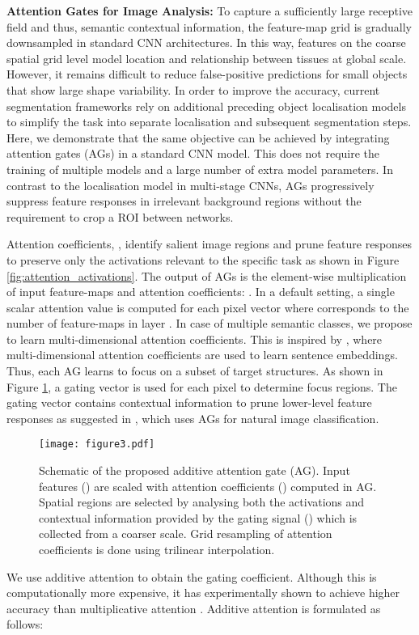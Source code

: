 \documentclass{article}
\begin{document}
\textbf{Attention Gates for Image Analysis:} To capture a sufficiently large receptive field and thus, semantic contextual information, the feature-map grid is gradually downsampled in standard CNN architectures. In this way, features on the coarse spatial grid level model location and relationship between tissues at global scale. However, it remains difficult to reduce false-positive predictions for small objects that show large shape variability. In order to improve the accuracy, current segmentation frameworks \cite{khened2018fully, roth2018media, roth2017hierarchical} rely on additional preceding object localisation models to simplify the task into separate localisation and subsequent segmentation steps. Here, we demonstrate that the same objective can be achieved by integrating attention gates (AGs) in a standard CNN model. This does not require the training of multiple models and a large number of extra model parameters. In contrast to the localisation model in multi-stage CNNs, AGs progressively suppress feature responses in irrelevant background regions without the requirement to crop a ROI between networks.

Attention coefficients, , identify salient image regions and prune feature responses to preserve only the activations relevant to the specific task as shown in Figure \ref{fig:attention_activations}. The output of AGs is the element-wise multiplication of input feature-maps and attention coefficients: . In a default setting, a single scalar attention value is computed for each pixel vector  where  corresponds to the number of feature-maps in layer . In case of multiple semantic classes, we propose to learn multi-dimensional attention coefficients. This is inspired by \cite{shen2017disan}, where multi-dimensional attention coefficients are used to learn sentence embeddings. Thus, each AG learns to focus on a subset of target structures. As shown in Figure \ref{fig:attentionblock}, a gating vector  is used for each pixel  to determine focus regions. The gating vector contains contextual information to prune lower-level feature responses as suggested in \cite{wang2017residual}, which uses AGs for natural image classification.
\begin{figure}[!t]
	\centering
	\texttt{[image: figure3.pdf]}
	\caption{Schematic of the proposed additive attention gate (AG). Input features () are scaled with attention coefficients () computed in AG. Spatial regions are selected by analysing both the activations and contextual information provided by the gating signal () which is collected from a coarser scale. Grid resampling of attention coefficients is done using trilinear interpolation.}
	\label{fig:attentionblock}
\end{figure}
We use additive attention \cite{bahdanau2014neural} to obtain the gating coefficient. Although this is computationally more expensive, it has experimentally shown to achieve higher accuracy than multiplicative attention \cite{luong2015effective}. Additive attention is formulated as follows: 
\end{document}
